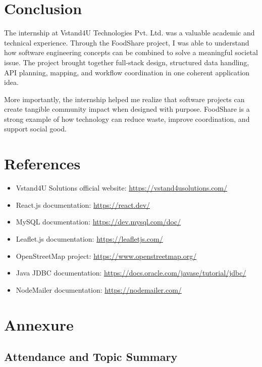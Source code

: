 \documentclass[12pt,a4paper]{report}
\newcommand{\companyname}{Vstand4U Technologies Pvt. Ltd.}
\newcommand{\projecttitle}{FoodShare}
\begin{document}
\chapter{Conclusion}
The internship at \companyname{} was a valuable academic and technical experience. Through the \projecttitle{} project, I was able to understand how software engineering concepts can be combined to solve a meaningful societal issue. The project brought together full-stack design, structured data handling, API planning, mapping, and workflow coordination in one coherent application idea.

More importantly, the internship helped me realize that software projects can create tangible community impact when designed with purpose. \projecttitle{} is a strong example of how technology can reduce waste, improve coordination, and support social good.

\chapter{References}
\begin{itemize}[leftmargin=1.2cm]
\item Vstand4U Solutions official website: \url{https://vstand4usolutions.com/}
\item React.js documentation: \url{https://react.dev/}
\item MySQL documentation: \url{https://dev.mysql.com/doc/}
\item Leaflet.js documentation: \url{https://leafletjs.com/}
\item OpenStreetMap project: \url{https://www.openstreetmap.org/}
\item Java JDBC documentation: \url{https://docs.oracle.com/javase/tutorial/jdbc/}
\item NodeMailer documentation: \url{https://nodemailer.com/}
\end{itemize}

\chapter{Annexure}

\section*{Attendance and Topic Summary}
\end{document}
